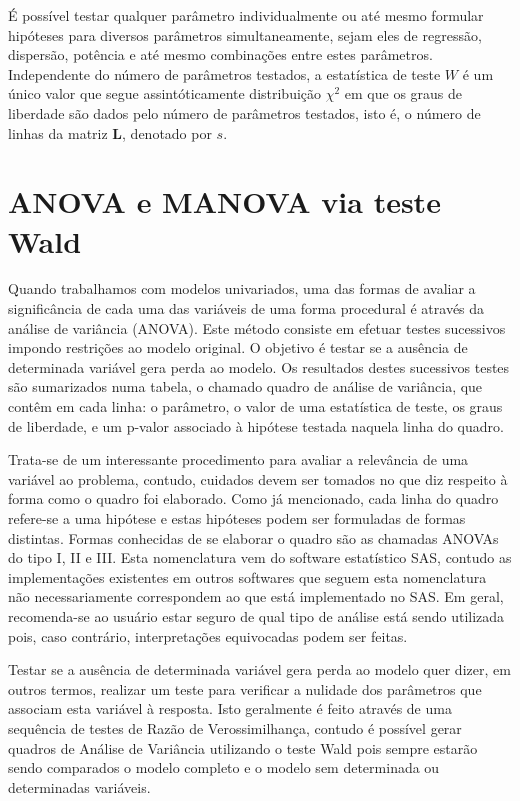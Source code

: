 É possível testar qualquer parâmetro individualmente ou até mesmo formular hipóteses para diversos parâmetros simultaneamente, sejam eles de regressão, dispersão, potência e até mesmo combinações entre estes parâmetros. Independente do número de parâmetros testados, a estatística de teste $W$ é um único valor que segue assintóticamente distribuição $\chi^2$ em que os graus de liberdade são dados pelo número de parâmetros testados, isto é, o número de linhas da matriz $\boldsymbol{L}$, denotado por $s$.

\section{ANOVA e MANOVA via teste Wald}

Quando trabalhamos com modelos univariados, uma das formas de avaliar a significância de cada uma das variáveis de uma forma procedural é através da análise de variância (ANOVA). Este método consiste em efetuar testes sucessivos impondo restrições ao modelo original. O objetivo é testar se a ausência de determinada variável gera perda ao modelo. Os resultados destes sucessivos testes são sumarizados numa tabela, o chamado quadro de análise de variância, que contêm em cada linha: o parâmetro, o valor de uma estatística de teste, os graus de liberdade, e um p-valor associado à hipótese testada naquela linha do quadro.

Trata-se de um interessante procedimento para avaliar a relevância de uma variável ao problema, contudo, cuidados devem ser tomados no que diz respeito à forma como o quadro foi elaborado. Como já mencionado, cada linha do quadro refere-se a uma hipótese e estas hipóteses podem ser formuladas de formas distintas. Formas conhecidas de se elaborar o quadro são as chamadas ANOVAs do tipo I, II e III. Esta nomenclatura vem do software estatístico SAS, contudo  as implementações existentes em outros softwares que seguem esta nomenclatura não necessariamente correspondem ao que está implementado no SAS. Em geral, recomenda-se ao usuário estar seguro de qual tipo de análise está sendo utilizada pois, caso contrário, interpretações equivocadas podem ser feitas.

Testar se a ausência de determinada variável gera perda ao modelo quer dizer, em outros termos, realizar um teste para verificar a nulidade dos parâmetros que associam esta variável à resposta. Isto geralmente é feito através de uma sequência de testes de Razão de Verossimilhança, contudo  é possível gerar quadros de Análise de Variância utilizando o teste Wald pois sempre estarão sendo comparados o modelo completo e o modelo sem determinada ou determinadas variáveis. 

